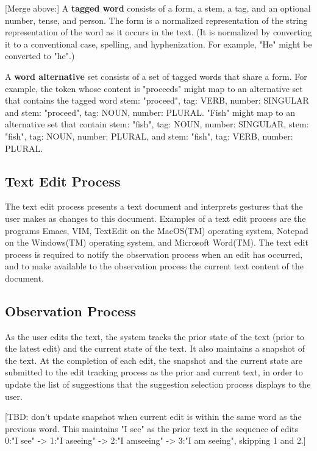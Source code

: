 \documentclass{article}
\newcommand{\dfn}[1]{\textbf{#1}}
\begin{document}
[Merge above:]
A \dfn{tagged word} consists of a form, a stem, a tag, and an optional number, tense, and person.  The form is a normalized representation of the string representation of the word as it occurs in the text.  (It is normalized by converting it to a conventional case, spelling, and hyphenization.  For example, "He" might be converted to "he".)

A \dfn{word alternative} set consists of a set of tagged words that share a form.  For example, the token whose content is "proceeds" might map to an alternative set that contains the tagged word {stem: "proceed", tag: VERB, number: SINGULAR} and {stem: "proceed", tag: NOUN, number: PLURAL}.  "Fish" might map to an alternative set that contain {stem: "fish", tag: NOUN, number: SINGULAR}, {stem: "fish", tag: NOUN, number: PLURAL}, and {stem: "fish", tag: VERB, number: PLURAL}.

\subsection{Text Edit Process}

The text edit process presents a text document and interprets gestures that the user makes as changes to this document.  Examples of a text edit process are the programs Emacs, VIM, TextEdit on the MacOS(TM) operating system, Notepad on the Windows(TM) operating system, and Microsoft Word(TM).  The text edit process is required to notify the observation process when an edit has occurred, and to make available to the observation process the current text content of the document.

\subsection{Observation Process}

As the user edits the text, the system tracks the prior state of the text (prior to the latest edit) and the current state of the text.  It also maintains a snapshot of the text.  At the completion of each edit, the snapshot and the current state are submitted to the edit tracking process as the prior and current text, in order to update the list of suggestions that the suggestion selection process displays to the user.

[TBD: don't update snapshot when current edit is within the same word as the previous word.  This maintains "I see" as the prior text in the sequence of edits 0:"I see" -> 1:"I aseeing" -> 2:"I amseeing" -> 3:"I am seeing", skipping 1 and 2.]
\end{document}
